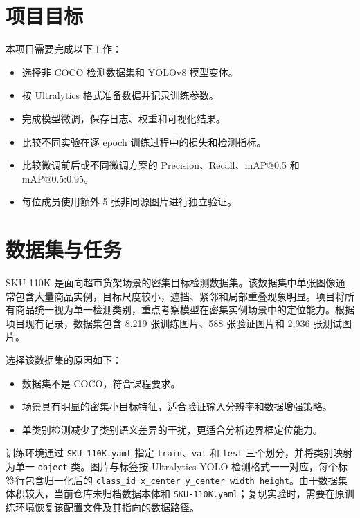 \documentclass[12pt,a4paper]{ctexart}
\begin{document}
\section{项目目标}

本项目需要完成以下工作：

\begin{itemize}[itemsep=2pt]
    \item 选择非 COCO 检测数据集和 YOLOv8 模型变体。
    \item 按 Ultralytics 格式准备数据并记录训练参数。
    \item 完成模型微调，保存日志、权重和可视化结果。
    \item 比较不同实验在逐 epoch 训练过程中的损失和检测指标。
    \item 比较微调前后或不同微调方案的 Precision、Recall、mAP@0.5 和 mAP@0.5:0.95。
    \item 每位成员使用额外 5 张非同源图片进行独立验证。
\end{itemize}

\section{数据集与任务}

SKU-110K 是面向超市货架场景的密集目标检测数据集。该数据集中单张图像通常包含大量商品实例，目标尺度较小，遮挡、紧邻和局部重叠现象明显。项目将所有商品统一视为单一检测类别，重点考察模型在密集实例场景中的定位能力。根据项目现有记录，数据集包含 8,219 张训练图片、588 张验证图片和 2,936 张测试图片。

选择该数据集的原因如下：

\begin{itemize}[itemsep=2pt]
    \item 数据集不是 COCO，符合课程要求。
    \item 场景具有明显的密集小目标特征，适合验证输入分辨率和数据增强策略。
    \item 单类别检测减少了类别语义差异的干扰，更适合分析边界框定位能力。
\end{itemize}

训练环境通过 \texttt{SKU-110K.yaml} 指定 \texttt{train}、\texttt{val} 和 \texttt{test} 三个划分，并将类别映射为单一 \texttt{object} 类。图片与标签按 Ultralytics YOLO 检测格式一一对应，每个标签行包含归一化后的 \texttt{class\_id x\_center y\_center width height}。由于数据集体积较大，当前仓库未归档数据本体和 \texttt{SKU-110K.yaml}；复现实验时，需要在原训练环境恢复该配置文件及其指向的数据路径。
\end{document}
